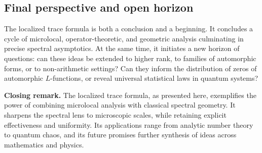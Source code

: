 \subsection{Final perspective and open horizon}\label{subsec:perspective}

The localized trace formula is both a conclusion and a beginning. It concludes a cycle of microlocal, operator-theoretic, and geometric analysis culminating in precise spectral asymptotics. At the same time, it initiates a new horizon of questions: can these ideas be extended to higher rank, to families of automorphic forms, or to non-arithmetic settings? Can they inform the distribution of zeros of automorphic $L$-functions, or reveal universal statistical laws in quantum systems?

\bigskip
\noindent\textbf{Closing remark.} The localized trace formula, as presented here, exemplifies the power of combining microlocal analysis with classical spectral geometry. It sharpens the spectral lens to microscopic scales, while retaining explicit effectiveness and uniformity. Its applications range from analytic number theory to quantum chaos, and its future promises further synthesis of ideas across mathematics and physics.

